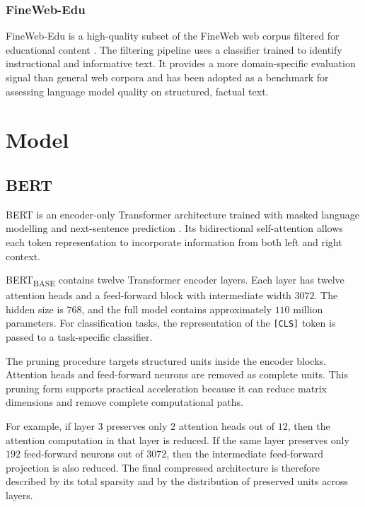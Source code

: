 \subsubsection{FineWeb-Edu}
FineWeb-Edu is a high-quality subset of the FineWeb web corpus filtered for educational content \citep{lozhkov2024fineweb_edu}. The filtering pipeline uses a classifier trained to identify instructional and informative text. It provides a more domain-specific evaluation signal than general web corpora and has been adopted as a benchmark for assessing language model quality on structured, factual text.

\section{Model}
\label{sec:models}

\subsection{BERT}
\label{subsec:bert}

BERT is an encoder-only Transformer architecture trained with masked language modelling and next-sentence prediction \citep{devlin2019bert,vaswani2017attention}. Its bidirectional self-attention allows each token representation to incorporate information from both left and right context.

BERT\textsubscript{BASE} contains twelve Transformer encoder layers. Each layer has twelve attention heads and a feed-forward block with intermediate width $3072$. The hidden size is $768$, and the full model contains approximately $110$ million parameters. For classification tasks, the representation of the \texttt{[CLS]} token is passed to a task-specific classifier.

The pruning procedure targets structured units inside the encoder blocks. Attention heads and feed-forward neurons are removed as complete units. This pruning form supports practical acceleration because it can reduce matrix dimensions and remove complete computational paths.

For example, if layer $3$ preserves only $2$ attention heads out of $12$, then the attention computation in that layer is reduced. If the same layer preserves only $192$ feed-forward neurons out of $3072$, then the intermediate feed-forward projection is also reduced. The final compressed architecture is therefore described by its total sparsity and by the distribution of preserved units across layers.

